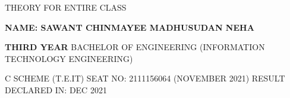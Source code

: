\documentclass{article} %
\begin{document}
\noindent *THEORY FOR ENTIRE CLASS

\noindent 

\noindent 

\noindent 

\noindent 

\noindent 

\noindent 

\noindent 

\noindent 

\noindent 

\noindent 

\noindent \textbf{}

\textbf{}

\noindent 

\noindent \textbf{NAME: SAWANT CHINMAYEE MADHUSUDAN NEHA}

\noindent \textbf{}

\noindent \textbf{THIRD YEAR} BACHELOR OF ENGINEERING (INFORMATION TECHNOLOGY ENGINEERING)

\noindent 

\noindent \textbf{} C SCHEME (T.E.IT)      SEAT NO: 2111156064 (NOVEMBER 2021)     RESULT DECLARED IN: DEC 2021

\noindent 

\noindent 
\end{document}
